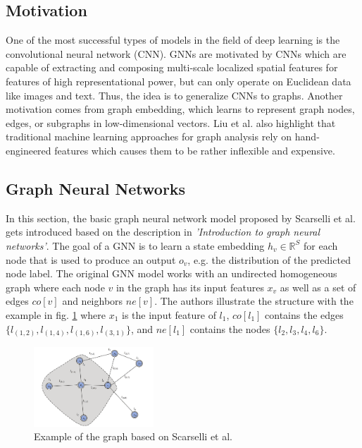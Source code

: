 \documentclass[a4paper,preprint]{sig-alternate}
\begin{document}
\subsection{Motivation}

One of the most successful types of models in the field of deep learning is the convolutional neural network (CNN).
GNNs are motivated by CNNs which are capable of extracting and composing multi-scale localized spatial features
for features of high representational power, but can only operate on Euclidean data like images and text.\cite{Liu_2020}
Thus, the idea is to generalize CNNs to graphs.\newline
Another motivation comes from graph embedding, which learns to represent graph nodes, edges, or subgraphs in low-dimensional vectors.\cite{Liu_2020}
Liu et al. also highlight that traditional machine learning approaches for graph analysis rely on hand-engineered features which causes them
to be rather inflexible and expensive.

\vfill
\pagebreak

\subsection{Graph Neural Networks}

In this section, the basic graph neural network model proposed by Scarselli et al. \cite{Scarselli_2009} gets introduced
based on the description in \textit{'Introduction to graph neural networks'}\cite{Liu_2020}.
The goal of a GNN is to learn a state embedding $h_v \in \mathbb{R}^S$ for each node that is used to produce an 
output $o_v$, e.g. the distribution of the predicted node label.
The original GNN model works with an undirected homogeneous graph where each node $v$ in the graph has its input features $x_v$
as well as a set of edges $co[v]$ and neighbors $ne[v]$. The authors illustrate the structure with the example in fig. \ref{fig:graph}
where $x_{1}$ is the input feature of $l_1$, $co[l_1]$ contains the edges $\{l_{(1, 2)}, l_{(1, 4)}, l_{(1, 6)}, l_{(3, 1)}\}$, and 
$ne[l_1]$ contains the nodes $\{l_2, l_3, l_4, l_6\}$.

\begin{figure}[h]
    \centering
    \includegraphics[width=0.4\textwidth]{img/graph.png}
    \caption{Example of the graph based on Scarselli et al. \cite{Liu_2020}}
    \label{fig:graph}
\end{figure}
\end{document}
